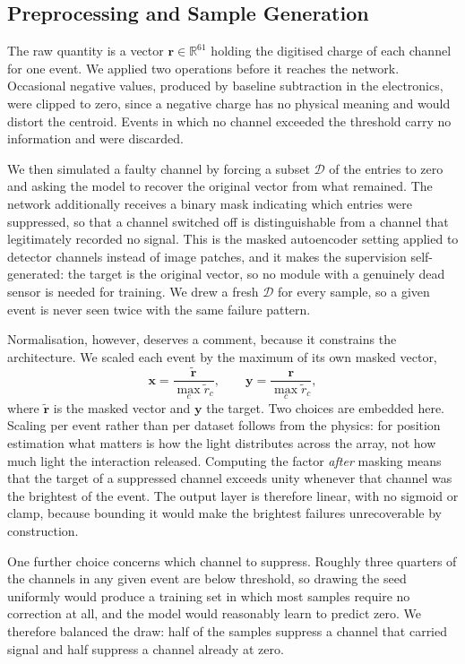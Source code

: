 \documentclass[10pt,conference]{IEEEtran}
\begin{document}
\subsection{Preprocessing and Sample Generation}
\label{sec:preproc}

The raw quantity is a vector $\mathbf{r} \in \mathbb{R}^{61}$ holding the
digitised charge of each channel for one event. We applied two operations
before it reaches the network. Occasional negative values, produced by baseline
subtraction in the electronics, were clipped to zero, since a negative charge
has no physical meaning and would distort the centroid. Events in which no
channel exceeded the threshold carry no information and were discarded.

We then simulated a faulty channel by forcing a subset $\mathcal{D}$ of the
entries to zero and asking the model to recover the original vector from what
remained. The network additionally receives a binary mask indicating which
entries were suppressed, so that a channel switched off is distinguishable from
a channel that legitimately recorded no signal. This is the masked autoencoder
setting \cite{he2022mae} applied to detector channels instead of image patches,
and it makes the supervision self-generated: the target is the original vector,
so no module with a genuinely dead sensor is needed for training. We drew a
fresh $\mathcal{D}$ for every sample, so a given event is never seen twice with
the same failure pattern.

Normalisation, however, deserves a comment, because it constrains the
architecture. We scaled each event by the maximum of its own masked vector,
%
\begin{equation}
\mathbf{x} = \frac{\tilde{\mathbf{r}}}{\max_{c} \tilde{r}_{c}},
\qquad
\mathbf{y} = \frac{\mathbf{r}}{\max_{c} \tilde{r}_{c}},
\label{eq:norm}
\end{equation}
%
where $\tilde{\mathbf{r}}$ is the masked vector and $\mathbf{y}$ the target.
Two choices are embedded here. Scaling per event rather than per dataset
follows from the physics: for position estimation what matters is how the light
distributes across the array, not how much light the interaction released.
Computing the factor \emph{after} masking means that the target of a suppressed
channel exceeds unity whenever that channel was the brightest of the event.
The output layer is therefore linear, with no sigmoid or clamp, because
bounding it would make the brightest failures unrecoverable by construction.

One further choice concerns which channel to suppress. Roughly three quarters
of the channels in any given event are below threshold, so drawing the seed
uniformly would produce a training set in which most samples require no
correction at all, and the model would reasonably learn to predict zero. We
therefore balanced the draw: half of the samples suppress a channel that
carried signal and half suppress a channel already at zero.
\end{document}
